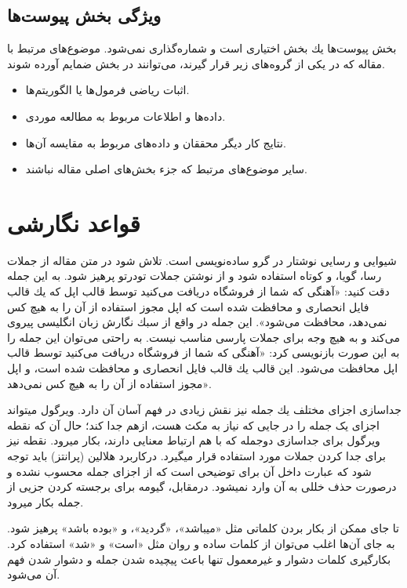 \documentclass{CSICC}
\begin{document}
\subsection{ویژگی بخش پیوست‌ها}
بخش پیوست‌ها یك بخش اختیاری است و شماره‌گذاری  نمی‌شود. موضوع‌های مرتبط با مقاله كه در یكی از گروه‌های زیر قرار گیرند، می‌توانند در بخش ضمایم آورده شوند.
\begin{itemize}
\item
اثبات ریاضی فرمول‌ها یا الگوریتم‌ها.
\item
داده‌ها و اطلاعات مربوط به مطالعه موردی.
\item
نتایج كار دیگر محققان و داده‌های مربوط به مقایسه آن‌ها.
\item
سایر موضوع‌های مرتبط كه جزء بخش‌های اصلی مقاله نباشند.
\end{itemize}


\section{قواعد نگارشی}

شیوایی و رسایی نوشتار در گرو ساده‌نویسی است. تلاش شود در متن مقاله از جملات رسا، گویا، و كوتاه استفاده شود و از نوشتن جملات تودرتو پرهیز شود. به این جمله دقت كنید: «آهنگی كه شما از فروشگاه  دریافت می‌كنید توسط قالب  اپل كه یك قالب فایل  انحصاری و محافظت شده است كه اپل مجوز استفاده از آن را به هیچ كس نمی‌دهد، محافظت می‌شود». این جمله در واقع از سبك نگارش زبان انگلیسی پیروی می‌كند و به هیچ وجه برای جملات پارسی مناسب نیست. به راحتی می‌توان این جمله را به این صورت بازنویسی كرد: «آهنگی كه شما از فروشگاه  دریافت می‌كنید توسط قالب  اپل محافظت می‌شود. این قالب یك قالب فایل  انحصاری و محافظت شده است، و اپل مجوز استفاده از آن را به هیچ كس نمی‌دهد».

جداسازی اجزای مختلف یك جمله نیز نقش زیادی در فهم آسان آن دارد. ویرگول می­تواند اجزای یک جمله را در جایی که نیاز به مکث هست، ازهم جدا کند؛ حال آن که نقطه ویرگول برای جداسازی دوجمله که با هم ارتباط معنایی دارند، بکار می­رود. نقطه نیز برای جدا كردن جملات مورد استفاده قرار می­گیرد. درکاربرد هلالین (پرانتز) باید توجه شود که عبارت داخل آن برای توضیحی است که از اجزای جمله محسوب نشده و درصورت حذف خللی به آن وارد نمی­شود. درمقابل، گیومه برای برجسته کردن جزیی از جمله بکار می­رود.

تا جای ممكن از بكار بردن كلماتی مثل «می­باشد»، «گردید»، و «بوده باشد» پرهیز شود. به جای آن‌ها اغلب می‌توان از كلمات ساده و روان مثل «است» و «شد» استفاده كرد. بكارگیری كلمات دشوار و غیرمعمول تنها باعث پیچیده شدن جمله و دشوار شدن فهم آن می‌شود.
\end{document}

